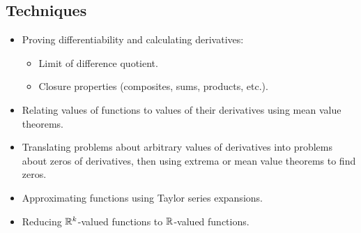 \subsection*{Techniques}
\begin{itemize}[itemsep=0pt]
\item Proving differentiability and calculating derivatives:
\begin{itemize}[itemsep=0pt]
\item Limit of difference quotient.
\item Closure properties (composites, sums, products, etc.).
\end{itemize}
\item Relating values of functions to values of their derivatives using mean value theorems.
\item Translating problems about arbitrary values of derivatives into problems about zeros of derivatives, then using extrema or mean value theorems to find zeros.
\item Approximating functions using Taylor series expansions.
\item Reducing \(\mathbb{R}^k\)-valued functions to \(\mathbb{R}\)-valued functions.
\end{itemize}

